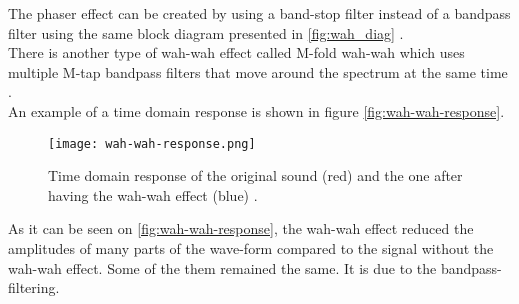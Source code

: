 The phaser effect can be created by using a band-stop filter instead of a bandpass filter using the same block diagram presented in \autoref{fig:wah_diag} \citep{wah-wah_cardiff}. \\

There is another type of wah-wah effect called M-fold wah-wah which uses multiple M-tap bandpass filters that move around the spectrum at the same time \citep{wah-wah_cardiff}. \\

An example of a time domain response is shown in figure \autoref{fig:wah-wah-response}. \\

\begin{figure} [htbp!]
	\centering
	\texttt{[image: wah-wah-response.png]}
	\caption{Time domain response of the original sound (red) and the one after having the wah-wah effect (blue) \citep{wah-wah_cardiff}.}
	\label{fig:wah-wah-response}
\end{figure}


As it can be seen on \autoref{fig:wah-wah-response}, the wah-wah effect reduced the amplitudes of many parts of the wave-form compared to the signal without the wah-wah effect. Some of the them remained the same. It is due to the bandpass-filtering.
